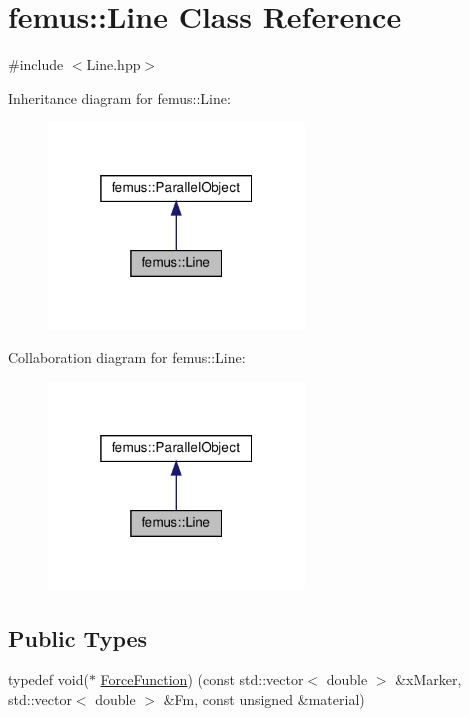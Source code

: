 \hypertarget{classfemus_1_1_line}{}\section{femus\+:\+:Line Class Reference}
\label{classfemus_1_1_line}


{\ttfamily \#include $<$Line.\+hpp$>$}



Inheritance diagram for femus\+:\+:Line\+:
\nopagebreak
\begin{figure}[H]
\begin{center}
\leavevmode
\includegraphics[width=193pt]{classfemus_1_1_line__inherit__graph}
\end{center}
\end{figure}


Collaboration diagram for femus\+:\+:Line\+:
\nopagebreak
\begin{figure}[H]
\begin{center}
\leavevmode
\includegraphics[width=193pt]{classfemus_1_1_line__coll__graph}
\end{center}
\end{figure}
\subsection*{Public Types}
\begin{DoxyCompactItemize}
\item 
typedef void($\ast$ \mbox{\hyperlink{classfemus_1_1_line_a34a5fe4198ea2eb339bffeef484ae77e}{Force\+Function}}) (const std\+::vector$<$ double $>$ \&x\+Marker, std\+::vector$<$ double $>$ \&Fm, const unsigned \&material)
\end{DoxyCompactItemize}
